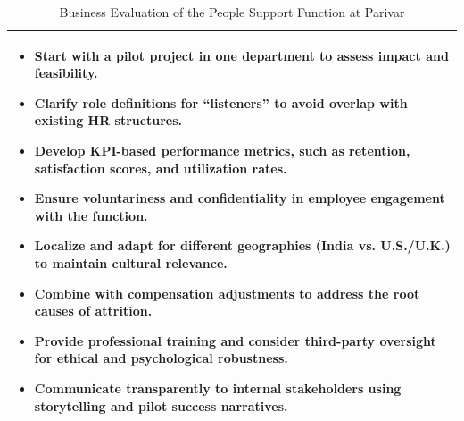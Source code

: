 \documentclass[10pt,a4paper]{book}
\begin{document}
\begin{table}[H]
\begin{tabular}{|p{4.2cm}|p{6cm}|p{6cm}|}
\multicolumn{3}{|p{15.2cm}|}{
\begin{itemize}[leftmargin=*, itemsep=1pt]
    \item \textbf{Start with a pilot project} in one department to assess impact and feasibility.
    \item \textbf{Clarify role definitions} for “listeners” to avoid overlap with existing HR structures.
    \item \textbf{Develop KPI-based performance metrics}, such as retention, satisfaction scores, and utilization rates.
    \item \textbf{Ensure voluntariness and confidentiality} in employee engagement with the function.
    \item \textbf{Localize and adapt} for different geographies (India vs. U.S./U.K.) to maintain cultural relevance.
    \item \textbf{Combine with compensation adjustments} to address the root causes of attrition.
    \item \textbf{Provide professional training} and consider third-party oversight for ethical and psychological robustness.
    \item \textbf{Communicate transparently} to internal stakeholders using storytelling and pilot success narratives.
\end{itemize}
} \\
\hline
\end{tabular}
\caption{Business Evaluation of the People Support Function at Parivar}
\end{table}

\clearpage

\end{document}
